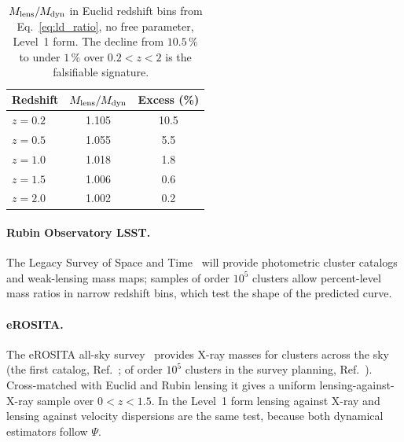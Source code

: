 \begin{table}[htbp]\centering\small
\caption[Level 1 predictions in Euclid redshift bins]{$M_{\rm lens}/M_{\rm dyn}$ in Euclid redshift bins from Eq.~\eqref{eq:ld_ratio}, no free
parameter, Level~1 form. The decline from $10.5\,\%$ to under $1\,\%$ over $0.2<z<2$ is the falsifiable signature. \calc\ \prediction}\label{tab:ld_euclid}
\begin{tabular}{lcc}\toprule
Redshift & $M_{\rm lens}/M_{\rm dyn}$ & Excess (\%)\\\midrule
$z=0.2$ & 1.105 & 10.5\\
$z=0.5$ & 1.055 & 5.5\\
$z=1.0$ & 1.018 & 1.8\\
$z=1.5$ & 1.006 & 0.6\\
$z=2.0$ & 1.002 & 0.2\\\bottomrule
\end{tabular}\end{table}

\paragraph{Rubin Observatory LSST.} The Legacy Survey of Space and Time~\cite{Ivezic2019} will provide photometric cluster catalogs and weak-lensing
mass maps; samples of order $10^5$ clusters allow percent-level mass ratios in narrow redshift bins, which test the shape of the predicted curve.
\prediction

\paragraph{eROSITA.} The eROSITA all-sky survey~\cite{Merloni2024} provides X-ray masses for clusters across the sky (the first catalog,
Ref.~\cite{Bulbul2024}; of order $10^5$ clusters in the survey planning, Ref.~\cite{Merloni2012}). Cross-matched with Euclid and Rubin lensing it gives a
uniform lensing-against-X-ray sample over $0<z<1.5$. In the Level~1 form lensing against X-ray and lensing against velocity dispersions are the same
test, because both dynamical estimators follow $\Psi$. \prediction

